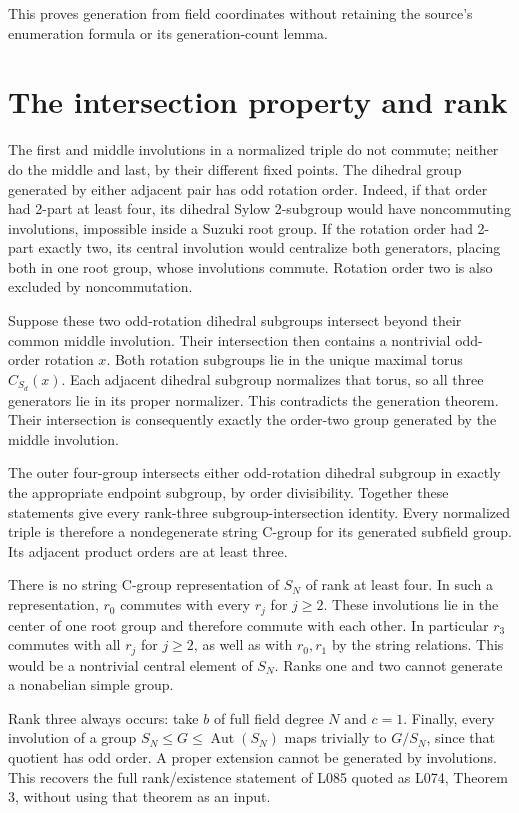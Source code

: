This proves generation from field coordinates without retaining the
source's enumeration formula or its generation-count lemma.

\section{The intersection property and
rank}\label{the-intersection-property-and-rank}

The first and middle involutions in a normalized triple do not commute;
neither do the middle and last, by their different fixed points. The
dihedral group generated by either adjacent pair has odd rotation order.
Indeed, if that order had 2-part at least four, its dihedral Sylow
2-subgroup would have noncommuting involutions, impossible inside a
Suzuki root group. If the rotation order had 2-part exactly two, its
central involution would centralize both generators, placing both in one
root group, whose involutions commute. Rotation order two is also
excluded by noncommutation.

Suppose these two odd-rotation dihedral subgroups intersect beyond their
common middle involution. Their intersection then contains a nontrivial
odd-order rotation \(x\). Both rotation subgroups lie in the unique
maximal torus \(C_{S_d}(x)\). Each adjacent dihedral subgroup normalizes
that torus, so all three generators lie in its proper normalizer. This
contradicts the generation theorem. Their intersection is consequently
exactly the order-two group generated by the middle involution.

The outer four-group intersects either odd-rotation dihedral subgroup in
exactly the appropriate endpoint subgroup, by order divisibility.
Together these statements give every rank-three subgroup-intersection
identity. Every normalized triple is therefore a nondegenerate string
C-group for its generated subfield group. Its adjacent product orders
are at least three.

There is no string C-group representation of \(S_N\) of rank at least
four. In such a representation, \(r_0\) commutes with every \(r_j\) for
\(j\ge2\). These involutions lie in the center of one root group and
therefore commute with each other. In particular \(r_3\) commutes with
all \(r_j\) for \(j\ge2\), as well as with \(r_0,r_1\) by the string
relations. This would be a nontrivial central element of \(S_N\). Ranks
one and two cannot generate a nonabelian simple group.

Rank three always occurs: take \(b\) of full field degree \(N\) and
\(c=1\). Finally, every involution of a group
\(S_N\le G\le\operatorname{Aut}(S_N)\) maps trivially to \(G/S_N\),
since that quotient has odd order. A proper extension cannot be
generated by involutions. This recovers the full rank/existence
statement of L085 quoted as L074, Theorem 3, without using that theorem
as an input.

